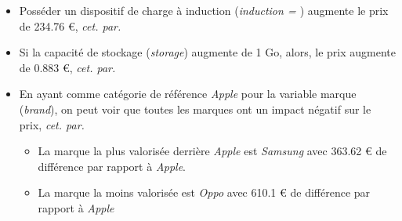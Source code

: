 \documentclass[
  12pt,
]{report}
\providecommand{\tightlist}{%
  \setlength{\itemsep}{0pt}\setlength{\parskip}{0pt}}\usepackage{longtable,booktabs,array}
\renewcommand{\texttt}[1]{\colorbox{light}{\color{highlight}{\ttfamily{#1}}}}
\begin{document}
\begin{itemize}
\item
  Posséder un dispositif de charge à induction (\emph{induction =
  \texttt{TRUE}}) augmente le prix de 234.76 €, \emph{cet. par.}
\item
  Si la capacité de stockage (\emph{storage}) augmente de 1 Go, alors,
  le prix augmente de 0.883 €, \emph{cet. par.}
\end{itemize}

\begin{itemize}
\item
  En ayant comme catégorie de référence \emph{Apple} pour la variable
  marque (\emph{brand}), on peut voir que toutes les marques ont un
  impact négatif sur le prix, \emph{cet. par.}

  \begin{itemize}
  \tightlist
  \item
    La marque la plus valorisée derrière \emph{Apple} est \emph{Samsung}
    avec 363.62 € de différence par rapport à \emph{Apple}.
  \item
    La marque la moins valorisée est \emph{Oppo} avec 610.1 € de
    différence par rapport à \emph{Apple}
  \end{itemize}
\end{itemize}
\end{document}
